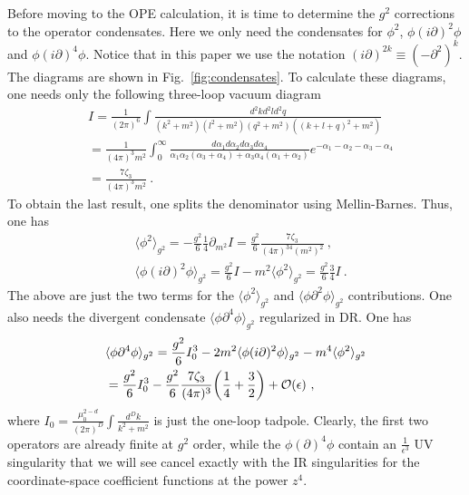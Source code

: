 \documentclass[a4paper,11pt]{article}
\begin{document}
Before moving to the OPE calculation, it is time to determine the $g^2$ corrections to the operator condensates. Here we only need the condensates for $\phi^2$, $\phi(i\partial)^2\phi$ and $\phi(i\partial)^4\phi$. Notice that in this paper we use the notation $(i\partial)^{2k}\equiv (-\partial^2)^k$. The diagrams are shown in Fig.~\ref{fig:condensates}. To calculate these diagrams, one needs only the following three-loop vacuum diagram
\begin{align}
&I=\frac{1}{(2\pi)^6}\int \frac{d^2kd^2ld^2q}{(k^2+m^2)(l^2+m^2)(q^2+m^2)((k+l+q)^2+m^2)}\nonumber \\ 
&=\frac{1}{(4\pi)^3m^2}\int_{0}^{\infty} \frac{d\alpha_1d\alpha_2d\alpha_3d\alpha_4}{\alpha_1\alpha_2(\alpha_3+\alpha_4)+\alpha_3\alpha_4(\alpha_1+\alpha_2)}e^{-\alpha_1-\alpha_2-\alpha_3-\alpha_4} \nonumber \\ 
&=\frac{7\zeta_3}{(4\pi)^3m^2} \ . \label{eq:defI}
\end{align}
To obtain the last result, one splits the denominator using Mellin-Barnes. 
Thus, one has
\begin{align}
& \langle \phi^2\rangle_{g^2}=-\frac{g^2}{6}\frac{1}{4}\partial_{m^2}I=\frac{g^2}{6}\frac{7\zeta_3}{(4\pi)^34(m^2)^2} \ , \label{eq: O12}\\
& \langle \phi (i\partial)^2\phi\rangle_{g^2}=\frac{g^2}{6}I-m^2\langle \phi^2\rangle_{g^2}=\frac{g^2}{6}\frac{3}{4}I \label{eq:O22} \ .
\end{align}
The above are just the two terms for the $\langle \phi^2\rangle_{g^2}$ and $\langle\phi \partial^2\phi\rangle_{g^2}$ contributions. One also needs the divergent condensate $\langle\phi \partial^4\phi\rangle_{g^2}$ regularized in DR. One has
\begin{align}
&\langle \phi\partial^4\phi \rangle_{g^2}= \frac{g^2}{6}I_0^3-2m^2\langle \phi (i\partial)^2\phi\rangle_{g^2}-m^4\langle \phi^2\rangle_{g^2}\nonumber \\ 
&=\frac{g^2}{6}I_0^3-\frac{g^2}{6}\frac{7\zeta_3}{(4\pi)^3}\bigg(\frac{1}{4}+\frac{3}{2}\bigg)+{\cal O}(\epsilon) \ , \label{eq:O4}
\end{align}
where
$I_0=\frac{\mu_0^{2-d}}{(2\pi)^D}\int \frac{d^D k}{k^2+m^2}$
is just the one-loop tadpole. Clearly, the first two operators are already finite at $g^2$ order, while the $\phi(\partial)^4\phi$ contain an $\frac{1}{\epsilon^3}$ UV singularity that we will see cancel exactly with the IR singularities for the coordinate-space coefficient functions at the power $z^4$. 
\end{document}

